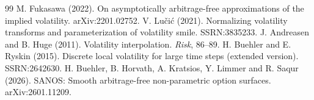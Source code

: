 \begin{thebibliography}{99}
 M. Fukasawa (2022). On asymptotically arbitrage-free approximations of the implied volatility. arXiv:2201.02752.
 V. Lu\v{c}i\'c (2021). Normalizing volatility transforms and parameterization of volatility smile. SSRN:3835233.
 J. Andreasen and B. Huge (2011). Volatility interpolation. \emph{Risk}, 86--89.
 H. Buehler and E. Ryskin (2015). Discrete local volatility for large time steps (extended version). SSRN:2642630.
 H. Buehler, B. Horvath, A. Kratsios, Y. Limmer and R. Saqur (2026). SANOS: Smooth arbitrage-free non-parametric option surfaces. arXiv:2601.11209.
\end{thebibliography}


